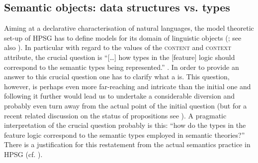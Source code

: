 \documentclass[output=paper]{langsci/langscibook}
\begin{document}
  
\subsection{Semantic objects: data structures vs. types}
\label{sec:semantic-objects}

Aiming at a declarative characterisation of natural languages, the model theoretic set-up of HPSG has to define models for its domain of linguistic objects  (\citet[Sec.~3]{Levine:Meurers:2006}; see also ).
%
In particular with regard to the values of the \textsc{content} and \textsc{context} attribute, the crucial question is \enquote{[\ldots] how types in the [feature] logic should correspond to the semantic types being represented.}  \citet[p.~70]{Penn:2000}.
%
In order to provide an answer to this crucial question one has to clarify what a  is. 
%
This question, however, is perhaps even more far-reaching and intricate than the initial one and following it further would lead us to undertake a considerable diversion and probably even turn away from the actual point of the initial question (but for a recent related discussion on the status of propositions see \citep{King:Soames:Speaks:2014}).
%
A pragmatic interpretation of the crucial question probably is this: \enquote{how do the types in the feature logic correspond to the semantic types employed in semantic theories?}
%
There is a justification for this restatement from the actual semantics practice in HPSG (cf. ).
\end{document}
